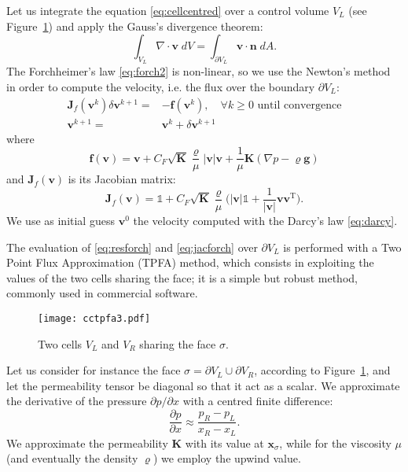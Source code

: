 Let us integrate the equation \eqref{eq:cellcentred} over a control volume 
$V_L$ (see Figure~\ref{fig:cctpfa}) and apply the Gauss's divergence theorem:
\begin{equation}
\int_{V_L} \nabla \cdot \mathbf{v} \; dV = \int_{\partial V_L} \mathbf{v} \cdot 
\mathbf{n} \; dA.
\end{equation}
The Forchheimer's law \eqref{eq:forch2} is non-linear, so we use the Newton's 
method in order to compute the velocity, i.e. the flux over the boundary 
$\partial 
V_L$:
\begin{align}
	\mathbf{J}_f(\mathbf{v}^k) \delta \mathbf{v}^{k+1} =& 
	-\mathbf{f}(\mathbf{v}^k), \quad \text{$\forall k\geq 0$ until 
	convergence}\\
	\mathbf{v}^{k+1} =& \mathbf{v}^k + \delta \mathbf{v}^{k+1}
\end{align}
where
\begin{equation} \label{eq:resforch}
	\mathbf{f}(\mathbf{v}) = \mathbf{v} + C_F \sqrt{\mathbf{K}} 
	\frac{\varrho}{\mu} 
	|\mathbf{v}|\mathbf{v} + \frac{1}{\mu} \mathbf{K}(\nabla p - \varrho 
	\mathbf{g} )
\end{equation}
and $\mathbf{J}_f(\mathbf{v})$ is its Jacobian matrix:
\begin{equation} \label{eq:jacforch}
\mathbf{J}_f(\mathbf{v}) = \mathbb{1} + 
C_F\sqrt{\mathbf{K}}\frac{\varrho}{\mu}\big(|\mathbf{v}|\mathbb{1} + 
\frac{1}{|\mathbf{v}|}{\mathbf{v}\mathbf{v}^\mathrm{T}}\big).
\end{equation}
We use as initial guess $\mathbf{v}^0$ the velocity computed with the Darcy's 
law \eqref{eq:darcy}.

The evaluation of \eqref{eq:resforch} and \eqref{eq:jacforch} over $\partial 
V_L$ is performed with a Two Point Flux Approximation (TPFA) method, which 
consists in exploiting the values of the two cells sharing the face; it is a 
simple but robust method, commonly used in commercial software.
\begin{figure}
	\centering
	\texttt{[image: cctpfa3.pdf]}
	\caption[Two cells $V_L$ and $V_R$ sharing the face $\sigma$]{Two cells 
	$V_L$ and $V_R$ sharing the face $\sigma$.}
	\label{fig:cctpfa}
\end{figure}
Let us consider for instance the face $\sigma = \partial V_L \cup \partial 
V_R$, according to Figure~\ref{fig:cctpfa}, and let the permeability tensor be 
diagonal so that it act as a scalar. We approximate the derivative of the 
pressure $\partial p /\partial 
x$ with a centred finite difference:
\begin{equation}
\frac{\partial p}{\partial x} \approx \frac{p_R-p_L}{x_R -x_L}.
\end{equation}
We approximate the permeability $\mathbf{K}$ with its value at 
$\mathbf{x}_\sigma$, while 
for the viscosity $\mu$ (and eventually the density $\varrho$) we employ the 
upwind value.

